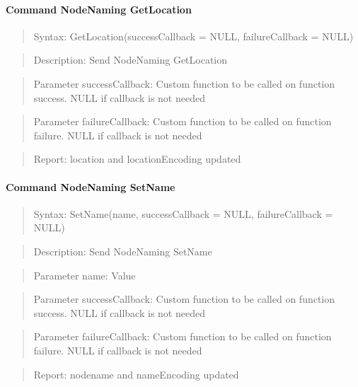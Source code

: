 \paragraph{Command NodeNaming GetLocation}
\begin{quote}Syntax: GetLocation(successCallback = NULL, failureCallback = NULL)\end{quote}
\begin{quote}Description: Send NodeNaming GetLocation\end{quote}
\begin{quote}Parameter successCallback: Custom function to be called on function success. NULL if callback is not needed\end{quote}
\begin{quote}Parameter failureCallback: Custom function to be called on function failure. NULL if callback is not needed\end{quote}
\begin{quote}Report: location and locationEncoding updated\end{quote}

\paragraph{Command NodeNaming SetName}
\begin{quote}Syntax: SetName(name, successCallback = NULL, failureCallback = NULL)\end{quote}
\begin{quote}Description: Send NodeNaming SetName\end{quote}
\begin{quote}Parameter name: Value\end{quote}
\begin{quote}Parameter successCallback: Custom function to be called on function success. NULL if callback is not needed\end{quote}
\begin{quote}Parameter failureCallback: Custom function to be called on function failure. NULL if callback is not needed\end{quote}
\begin{quote}Report: nodename and nameEncoding updated\end{quote}


